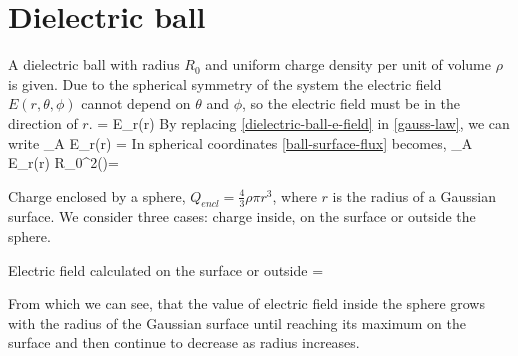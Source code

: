 \section{Dielectric ball}
A dielectric ball with radius $R_{0}$ and uniform charge density per unit of volume $\rho$ is given. Due to
the spherical symmetry of the system the electric field $E(r,\theta,\phi)$ cannot depend on $\theta$
and $\phi$, so the electric field must be in the direction of $r$.
\be\label{dielectric-ball-e-field}
 = E_r(r) 
\ee
By replacing \ref{dielectric-ball-e-field} in \ref{gauss-law}, we can write
\be\label{ball-surface-flux}
\oiint_A E_r(r)  \cdot {} =
\ee
In spherical coordinates \ref{ball-surface-flux} becomes, 
\be\label{ball-surface-flux-2}
\oiint_A E_r(r) \cdot {}R_{0}^{2}\sin(\phi)\theta{}\phi =
\ee

Charge enclosed by a sphere, $Q_{encl}=\frac{4}{3}\rho\pi r^3$, where $r$ is the radius of a Gaussian surface. We consider three cases: charge inside, on the surface or outside the sphere.


Electric field calculated on the surface or outside
\be
{}=
\ee

From which we can see, that the value of electric field inside the sphere grows with the radius of the Gaussian surface until reaching its maximum on the surface and then continue to decrease as radius increases.